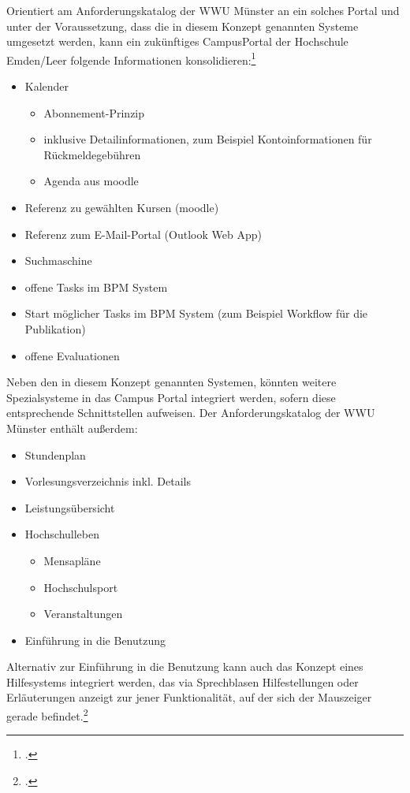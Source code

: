 Orientiert am Anforderungskatalog der WWU Münster an ein solches Portal und unter der Voraussetzung, dass die in diesem Konzept genannten Systeme 
umgesetzt werden, kann ein zukünftiges CampusPortal der Hochschule Emden/Leer folgende Informationen konsolidieren:\footcite[Vgl.][158 ff.]{vogl_fortschritte_2012}

\begin{itemize}
	\item Kalender
	\begin{itemize}
		\item Abonnement-Prinzip
		\item inklusive Detailinformationen, zum Beispiel Kontoinformationen für Rückmeldegebühren
		\item Agenda aus moodle
	\end{itemize}
	\item Referenz zu gewählten Kursen (moodle)
	\item Referenz zum E-Mail-Portal (Outlook Web App)
	\item Suchmaschine
	\item offene Tasks im BPM System
	\item Start möglicher Tasks im BPM System (zum Beispiel Workflow für die Publikation)
	\item offene Evaluationen
\end{itemize}

Neben den in diesem Konzept genannten Systemen, könnten weitere Spezialsysteme in das Campus Portal integriert werden, sofern diese entsprechende Schnittstellen aufweisen. Der Anforderungskatalog der WWU Münster enthält außerdem:

\begin{itemize}
	\item Stundenplan
	\item Vorlesungsverzeichnis inkl. Details
	\item Leistungsübersicht
	\item Hochschulleben
	\begin{itemize}
		\item Mensapläne
		\item Hochschulsport
		\item Veranstaltungen
	\end{itemize}
	\item Einführung in die Benutzung
\end{itemize}

Alternativ zur Einführung in die Benutzung kann auch das Konzept eines Hilfesystems integriert werden, das via Sprechblasen Hilfestellungen oder Erläuterungen anzeigt zur jener Funktionalität, auf der sich der Mauszeiger gerade befindet.\footcite[Vgl.][22]{vogl_bericht_2013}

